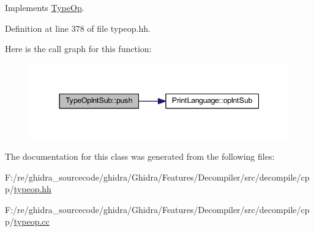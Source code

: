 Implements \mbox{\hyperlink{class_type_op_ac9c9544203ed74dabe6ac662b653b2af}{Type\+Op}}.



Definition at line 378 of file typeop.\+hh.

Here is the call graph for this function\+:
\nopagebreak
\begin{figure}[H]
\begin{center}
\leavevmode
\includegraphics[width=344pt]{class_type_op_int_sub_a282e230df3a8e7d2a2e540f5cb5d76b1_cgraph}
\end{center}
\end{figure}


The documentation for this class was generated from the following files\+:\begin{DoxyCompactItemize}
\item 
F\+:/re/ghidra\+\_\+sourcecode/ghidra/\+Ghidra/\+Features/\+Decompiler/src/decompile/cpp/\mbox{\hyperlink{typeop_8hh}{typeop.\+hh}}\item 
F\+:/re/ghidra\+\_\+sourcecode/ghidra/\+Ghidra/\+Features/\+Decompiler/src/decompile/cpp/\mbox{\hyperlink{typeop_8cc}{typeop.\+cc}}\end{DoxyCompactItemize}
